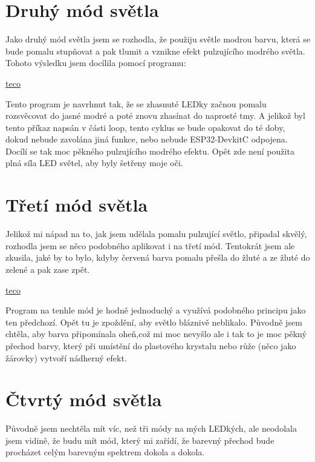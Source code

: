 \section{Druhý mód světla}
Jako druhý mód světla jsem se rozhodla, že použiju světle modrou barvu, která se bude pomalu stupňovat a pak tlumit a vznikne efekt pulzujícího modrého světla. Tohoto výsledku jsem docílila pomocí programu: 

\href{https://www.tecomat.cz/products/}{teco}

%


Tento program je navrhnut tak, že se zhasnuté LEDky začnou pomalu rozsvěcovat do jasné modré a poté znovu zhasínat do naprosté tmy. A jelikož byl tento příkaz napsán v části loop, tento cyklus se bude opakovat do té doby, dokud nebude zavolána jiná funkce, nebo nebude ESP32-DevkitC odpojena. Docílí se tak moc pěkného pulzujícího modrého efektu. Opět zde není použita plná síla LED světel, aby byly šetřeny moje oči.  


\section{Třetí mód světla}
Jelikož mi nápad na to, jak jsem udělala pomalu pulzující světlo, připadal skvělý, rozhodla jsem se něco podobného aplikovat i na třetí mód. Tentokrát jsem ale zkusila, jaké by to bylo, kdyby červená barva pomalu přešla do žluté a ze žluté do zelené a pak zase zpět. 

\href{https://www.tecomat.cz/products/}{teco}

%


Program na tenhle mód je hodně jednoduchý a využívá podobného principu jako ten předchozí. Opět tu je zpoždění, aby světlo bláznivě neblikalo. Původně jsem chtěla, aby barva připomínala oheň,což mi moc nevyšlo ale i tak to je moc pěkný přechod barvy, který při umístění do plastového krystalu nebo růže (něco jako žárovky) vytvoří nádherný efekt.


\section{Čtvrtý mód světla}
Původně jsem nechtěla mít víc, než tři módy na mých LEDkých, ale neodolala jsem vidině, že budu mít mód, který mi zařídí, že barevný přechod bude procházet celým barevným spektrem  dokola a dokola. 


